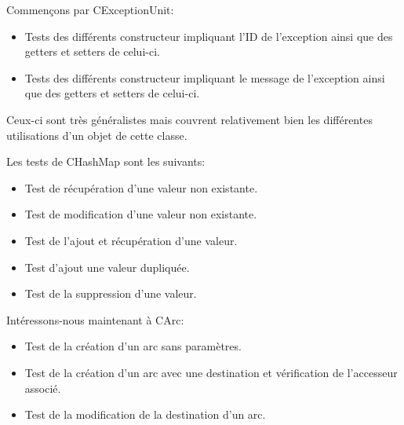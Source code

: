 		Commençons par CExceptionUnit:
		\begin{itemize}
			\item Tests des différents constructeur impliquant l'ID de l'exception ainsi que des getters et setters de celui-ci.
			\item Tests des différents constructeur impliquant le message de l'exception ainsi que des getters et setters de celui-ci.\\
		\end{itemize}
		Ceux-ci sont très généralistes mais couvrent relativement bien les différentes utilisations d'un objet de cette classe.
		
		Les tests de CHashMap sont les suivants:
		\begin{itemize}
			\item Test de récupération d'une valeur non existante.
			\item Test de modification d'une valeur non existante.
			\item Test de l'ajout et récupération d'une valeur.
			\item Test d'ajout une valeur dupliquée.
			\item Test de la suppression d'une valeur.
		\end{itemize}
		
		Intéressons-nous maintenant à CArc:
		\begin{itemize}
			\item Test de la création d'un arc sans paramètres.
			\item Test de la création d'un arc avec une destination et vérification de l'accesseur associé.
			\item Test de la modification de la destination d'un arc.
		\end{itemize}
		
